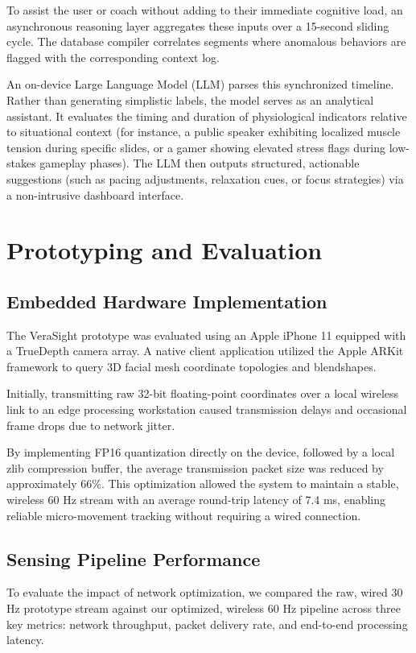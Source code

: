 \documentclass[sigconf]{acmart}
\begin{document}
To assist the user or coach without adding to their immediate cognitive load, an asynchronous reasoning layer aggregates these inputs over a 15-second sliding cycle. The database compiler correlates segments where anomalous behaviors are flagged with the corresponding context log. 

An on-device Large Language Model (LLM) parses this synchronized timeline. Rather than generating simplistic labels, the model serves as an analytical assistant. It evaluates the timing and duration of physiological indicators relative to situational context (for instance, a public speaker exhibiting localized muscle tension during specific slides, or a gamer showing elevated stress flags during low-stakes gameplay phases). The LLM then outputs structured, actionable suggestions (such as pacing adjustments, relaxation cues, or focus strategies) via a non-intrusive dashboard interface.

\section{Prototyping and Evaluation}

\subsection{Embedded Hardware Implementation}
The VeraSight prototype was evaluated using an Apple iPhone 11 equipped with a TrueDepth camera array. A native client application utilized the Apple ARKit framework to query 3D facial mesh coordinate topologies and blendshapes. 

Initially, transmitting raw 32-bit floating-point coordinates over a local wireless link to an edge processing workstation caused transmission delays and occasional frame drops due to network jitter. 

By implementing FP16 quantization directly on the device, followed by a local zlib compression buffer, the average transmission packet size was reduced by approximately 66\%. This optimization allowed the system to maintain a stable, wireless 60 Hz stream with an average round-trip latency of 7.4 ms, enabling reliable micro-movement tracking without requiring a wired connection.

\subsection{Sensing Pipeline Performance}
To evaluate the impact of network optimization, we compared the raw, wired 30 Hz prototype stream against our optimized, wireless 60 Hz pipeline across three key metrics: network throughput, packet delivery rate, and end-to-end processing latency.
\end{document}

